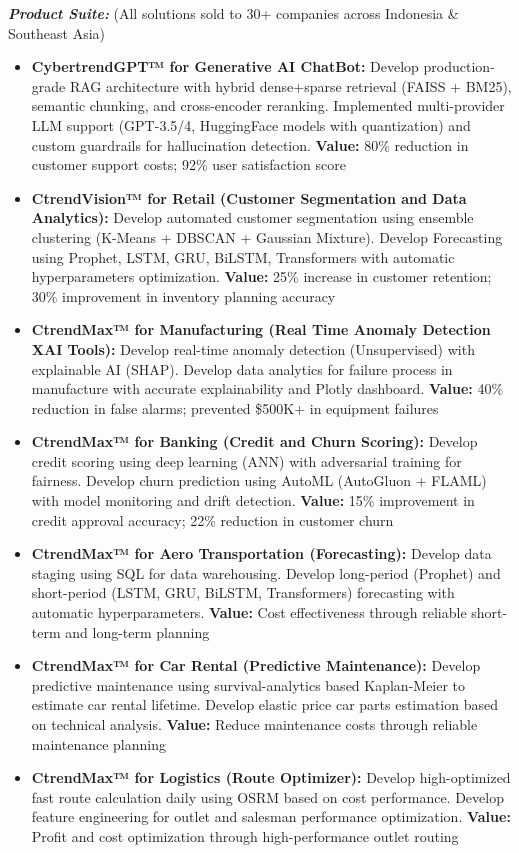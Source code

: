 \documentclass[10pt,a4paper]{article}
\begin{document}
\textit{\textbf{Product Suite:}} (All solutions sold to 30+ companies across Indonesia \& Southeast Asia)
\begin{itemize}
    \item \textbf{CybertrendGPT™ for Generative AI ChatBot:} Develop production-grade RAG architecture with hybrid dense+sparse retrieval (FAISS + BM25), semantic chunking, and cross-encoder reranking. Implemented multi-provider LLM support (GPT-3.5/4, HuggingFace models with quantization) and custom guardrails for hallucination detection. \textcolor{accent}{\textbf{Value:}} 80\% reduction in customer support costs; 92\% user satisfaction score
    \item \textbf{CtrendVision™ for Retail (Customer Segmentation and Data Analytics):} Develop automated customer segmentation using ensemble clustering (K-Means + DBSCAN + Gaussian Mixture). Develop Forecasting using Prophet, LSTM, GRU, BiLSTM, Transformers with automatic hyperparameters optimization. \textcolor{accent}{\textbf{Value:}} 25\% increase in customer retention; 30\% improvement in inventory planning accuracy
    \item \textbf{CtrendMax™ for Manufacturing (Real Time Anomaly Detection XAI Tools):} Develop real-time anomaly detection (Unsupervised) with explainable AI (SHAP). Develop data analytics for failure process in manufacture with accurate explainability and Plotly dashboard. \textcolor{accent}{\textbf{Value:}} 40\% reduction in false alarms; prevented \$500K+ in equipment failures
    \item \textbf{CtrendMax™ for Banking (Credit and Churn Scoring):} Develop credit scoring using deep learning (ANN) with adversarial training for fairness. Develop churn prediction using AutoML (AutoGluon + FLAML) with model monitoring and drift detection. \textcolor{accent}{\textbf{Value:}} 15\% improvement in credit approval accuracy; 22\% reduction in customer churn
    \item \textbf{CtrendMax™ for Aero Transportation (Forecasting):} Develop data staging using SQL for data warehousing. Develop long-period (Prophet) and short-period (LSTM, GRU, BiLSTM, Transformers) forecasting with automatic hyperparameters. \textcolor{accent}{\textbf{Value:}} Cost effectiveness through reliable short-term and long-term planning
    \item \textbf{CtrendMax™ for Car Rental (Predictive Maintenance):} Develop predictive maintenance using survival-analytics based Kaplan-Meier to estimate car rental lifetime. Develop elastic price car parts estimation based on technical analysis. \textcolor{accent}{\textbf{Value:}} Reduce maintenance costs through reliable maintenance planning
    \item \textbf{CtrendMax™ for Logistics (Route Optimizer):} Develop high-optimized fast route calculation daily using OSRM based on cost performance. Develop feature engineering for outlet and salesman performance optimization. \textcolor{accent}{\textbf{Value:}} Profit and cost optimization through high-performance outlet routing
\end{itemize}
\end{document}
